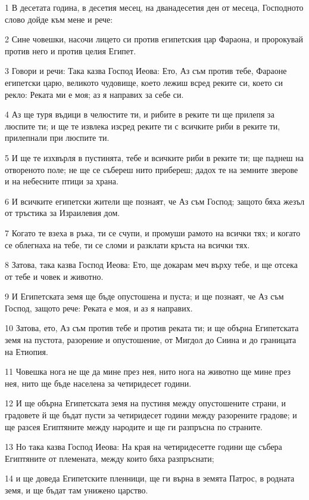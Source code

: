 \par 1 В десетата година, в десетия месец, на дванадесетия ден от месеца, Господното слово дойде към мене и рече:
\par 2 Сине човешки, насочи лицето си против египетския цар Фараона, и пророкувай против него и против целия Египет.
\par 3 Говори и речи: Така казва Господ Иеова: Ето, Аз съм против тебе, Фараоне египетски царю, великото чудовище, което лежиш всред реките си, което си рекло: Реката ми е моя; аз я направих за себе си.
\par 4 Аз ще туря въдици в челюстите ти, и рибите в реките ти ще прилепя за люспите ти; и ще те извлека изсред реките ти с всичките риби в реките ти, прилепнали при люспите ти.
\par 5 И ще те изхвърля в пустинята, тебе и всичките риби в реките ти; ще паднеш на отвореното поле; не ще се събереш нито прибереш; дадох те на земните зверове и на небесните птици за храна.
\par 6 И всичките египетски жители ще познаят, че Аз съм Господ; защото бяха жезъл от тръстика за Израилевия дом.
\par 7 Когато те взеха в ръка, ти се счупи, и промуши рамото на всички тях; и когато се облегнаха на тебе, ти се сломи и разклати кръста на всички тях.
\par 8 Затова, така казва Господ Иеова: Ето, ще докарам меч върху тебе, и ще отсека от тебе и човек и животно.
\par 9 И Египетската земя ще бъде опустошена и пуста; и ще познаят, че Аз съм Господ, защото рече: Реката е моя, и аз я направих.
\par 10 Затова, ето, Аз съм против тебе и против реката ти; и ще обърна Египетската земя на пустота, разорение и опустошение, от Мигдол до Сиина и до границата на Етиопия.
\par 11 Човешка нога не ще да мине през нея, нито нога на животно ще мине през нея, нито ще бъде населена за четиридесет години.
\par 12 И ще обърна Египетската земя на пустиня между опустошените страни, и градовете й ще бъдат пусти за четиридесет години между разорените градове; и ще разсея Египтяните между народите и ще ги разпръсна по страните.
\par 13 Но така казва Господ Иеова: На края на четиридесетте години ще събера Египтяните от племената, между които бяха разпръснати;
\par 14 и ще доведа Египетските пленници, ще ги върна в земята Патрос, в родната земя, и ще бъдат там унижено царство.
